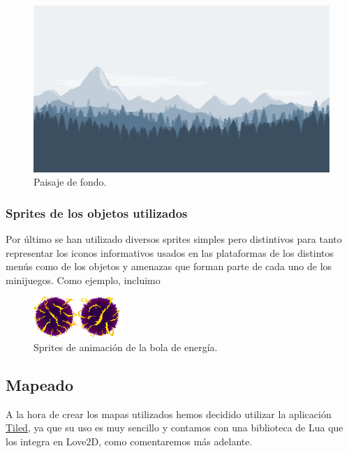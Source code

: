 \documentclass[12pt, spanish]{article}
\begin{document}
\begin{figure}[H]
	\centering
	\includegraphics[width=\textwidth]{"multimedia/landscape.png"}
	\caption{Paisaje de fondo.}\label{figure:landscape}
\end{figure}

\subsubsection{Sprites de los objetos utilizados}

Por último se han utilizado diversos sprites simples pero distintivos para tanto representar los iconos informativos usados en las plataformas de los distintos menús como de los objetos y amenazas que forman parte de cada uno de los minijuegos. Como ejemplo, incluimo

\begin{figure}[H]
	\centering
	\includegraphics[width=0.3\textwidth]{"multimedia/energy_ball.png"}
	\caption{Sprites de animación de la bola de energía.}\label{figure:energy_ball}
\end{figure}

\subsection{Mapeado}

A la hora de crear los mapas utilizados hemos decidido utilizar la aplicación \href{https://www.mapeditor.org/}{Tiled}, ya que su uso es muy sencillo y contamos con una biblioteca de Lua que los integra en Love2D, como comentaremos más adelante.
\end{document}
